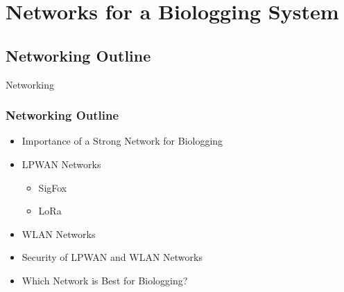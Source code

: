\documentclass{beamer}
\begin{document}
\section{Networks for a Biologging System}

\subsection{Networking Outline}
  \begin{frame}{Networking}
    \frametitle{Networking Outline}
    \begin{itemize}
      \item Importance of a Strong Network for Biologging
      \item LPWAN Networks
      \begin{itemize}
        \item SigFox
        \item LoRa
      \end{itemize}
      \item WLAN Networks
      \item Security of LPWAN and WLAN Networks
      \item Which Network is Best for Biologging?
    \end{itemize}
  \end{frame}
\end{document}
